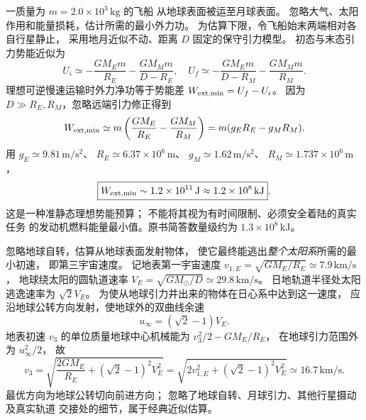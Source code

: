 一质量为 $m=2.0\times10^3\,\mathrm{kg}$ 的飞船
从地球表面被运至月球表面。
忽略大气、太阳作用和能量损耗，估计所需的最小外力功。
\exsolution
为估算下限，令飞船始末两端相对各自行星静止，
采用地月近似不动、距离 $D$ 固定的保守引力模型。
初态与末态引力势能近似为
\[
U_i\simeq-\frac{GM_E m}{R_E}
-\frac{GM_Mm}{D-R_E},\quad
U_f\simeq-\frac{GM_E m}{D-R_M}
-\frac{GM_Mm}{R_M}.
\]
理想可逆慢速运输时外力净功等于势能差
$W_{\rm ext,min}=U_f-U_i$。
因为 $D\gg R_E,R_M$，忽略远端引力修正得到
\[
W_{\rm ext,min}\simeq
m\left(\frac{GM_E}{R_E}-\frac{GM_M}{R_M}\right)
=m(g_ER_E-g_MR_M).
\]
用 $g_E\simeq9.81\,\mathrm{m/s^2}$、
$R_E\simeq6.37\times10^6\,\mathrm m$、
$g_M\simeq1.62\,\mathrm{m/s^2}$、
$R_M\simeq1.737\times10^6\,\mathrm m$，
\[
\boxed{W_{\rm ext,min}\sim1.2\times10^{11}\,\mathrm J
\approx1.2\times10^8\,\mathrm{kJ}}.
\]
\excheck 这是一种准静态理想势能预算；
不能将其视为有时间限制、必须安全着陆的真实任务
的发动机燃料能量最小值。原书简答数量级约为
$1.3\times10^8\,\mathrm{kJ}$。

忽略地球自转，估算从地球表面发射物体，
使它最终能逃出\emph{整个太阳系}所需的最小初速，
即第三宇宙速度。
\exsolution
记地表第一宇宙速度
$v_{1,E}=\sqrt{GM_E/R_E}\simeq7.9\,\mathrm{km/s}$，
地球绕太阳的圆轨道速率
$V_E=\sqrt{GM_\odot/D}\simeq29.8\,\mathrm{km/s}$。
日地轨道半径处太阳逃逸速率为 $\sqrt2V_E$。
为使从地球引力井出来的物体在日心系中达到这一速度，
应沿地球公转方向发射，使地球外的双曲线余速
\[
u_\infty=(\sqrt2-1)V_E.
\]
地表初速 $v_3$ 的单位质量地球中心机械能为
$v_3^2/2-GM_E/R_E$，
在地球引力范围外为 $u_\infty^2/2$，
故
\[
\boxed{v_3=
\sqrt{\frac{2GM_E}{R_E}
+(\sqrt2-1)^2V_E^2}
=\sqrt{2v_{1,E}^2+(\sqrt2-1)^2V_E^2}
\simeq16.7\,\mathrm{km/s}}.
\]
\excheck 最优方向为地球公转切向前进方向；
忽略了地球自转、月球引力、其他行星摄动及真实轨道
交接处的细节，属于经典近似估算。
